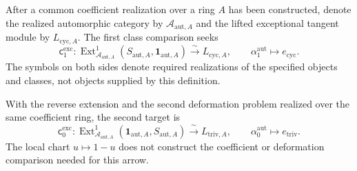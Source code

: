 \begin{definition}
\label{v4-arith:w10-d:def:match-target-s1}
After a common coefficient realization over a ring $A$ has been
constructed, denote the realized automorphic category by
$\mathcal A_{\mathrm{aut},A}$ and the lifted exceptional tangent
module by $L_{\mathrm{cyc},A}$. The first class comparison seeks
\begin{equation}\label{v4-arith:w10-d:eq:match-target-s1}
 \mathsf c^{\mathrm{exc}}_1:
 \operatorname{Ext}^1_{\mathcal A_{\mathrm{aut},A}}
 (S_{\mathrm{aut},A},\mathbf1_{\mathrm{aut},A})
       \xrightarrow{\ \sim\ }L_{\mathrm{cyc},A},
 \qquad \alpha^{\mathrm{aut}}_1\longmapsto e_{\mathrm{cyc}}.
\end{equation}
The symbols on both sides denote required realizations of the specified
objects and classes, not objects supplied by this definition.
\end{definition}

\begin{definition}
\label{v4-arith:w10-d:def:match-target-s0}
With the reverse extension and the second deformation problem realized
over the same coefficient ring, the second target is
\begin{equation}\label{v4-arith:w10-d:eq:match-target-s0}
 \mathsf c^{\mathrm{exc}}_0:
 \operatorname{Ext}^1_{\mathcal A_{\mathrm{aut},A}}
 (\mathbf1_{\mathrm{aut},A},S_{\mathrm{aut},A})
       \xrightarrow{\ \sim\ }L_{\mathrm{triv},A},
 \qquad \alpha^{\mathrm{aut}}_0\longmapsto e_{\mathrm{triv}}.
\end{equation}
The local chart $u\mapsto1-u$ does not construct the coefficient
or deformation comparison needed for this arrow.
\end{definition}

